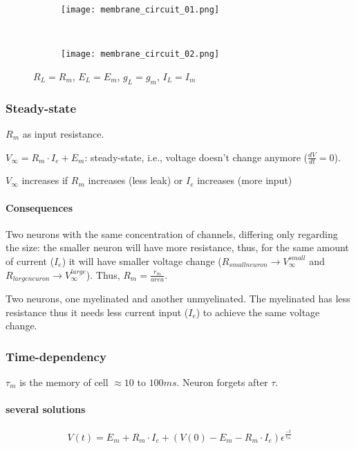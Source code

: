 \documentclass[main]{subfiles}
\begin{document}
\begin{figure}[H]
	\centering
	\begin{subfigure}[b]{0.3\textwidth}
		\centering
		\texttt{[image: membrane\_circuit\_01.png]}
	\end{subfigure}%
	~
	\begin{subfigure}[b]{0.5\textwidth}
		\centering
		\texttt{[image: membrane\_circuit\_02.png]}
	\end{subfigure}
	\caption{$R_L = R_m$, $E_L = E_m$, $g_L = g_m$, $I_L = I_m$}
\end{figure}

\subsubsection{Steady-state}
$R_m$ as input resistance.

$V_\infty = R_m \cdot I_e + E_m$: steady-state, i.e., voltage doesn't change anymore ($\frac{dV}{dt}=0$).

$V_\infty$ increases if $R_m$ increases (less leak) or $I_e$ increases (more input)

\paragraph{Consequences}
Two neurons with the same concentration of channels, differing only regarding the size: the smaller neuron will have more resistance, thus, for the same amount of current ($I_e$) it will have smaller voltage change ($R_{small neuron} \rightarrow V^{small}_\infty$ and $R_{large neuron} \rightarrow V^{large}_\infty$). Thus, $R_m = \frac{r_m}{area}$.

Two neurons, one myelinated and another unmyelinated. The myelinated has less resistance thus it needs less current input ($I_e$) to achieve the same voltage change.

\subsubsection{Time-dependency}
$\tau_m$ is the memory of cell $\approx 10$ to $100 ms$. Neuron forgets after $\tau$.

\paragraph{several solutions}
\[V(t) = E_m + R_m \cdot I_e + (V(0) - E_m - R_m \cdot I_e) \epsilon^{\frac{-t}{\tau_m}}\]
\end{document}
